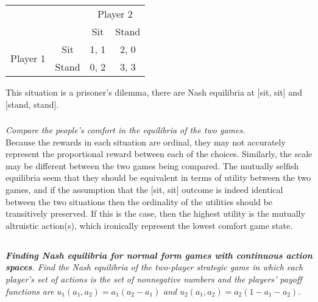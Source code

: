 \documentclass[12pt]{amsart}
\begin{document}
	\begin{center}
		\def\arraystretch{1.25}%
		\begin{tabular}{cccc}
			&                            & \multicolumn{2}{c}{Player 2}                           \\
			& \multicolumn{1}{c|}{}      & \multicolumn{1}{c|}{Sit}  & \multicolumn{1}{c|}{Stand} \\ \cline{2-4} 
			\multirow{2}{*}{Player 1} & \multicolumn{1}{c|}{Sit}   & \multicolumn{1}{c|}{1, 1} & \multicolumn{1}{c|}{2, 0}  \\ \cline{2-4} 
			& \multicolumn{1}{c|}{Stand} & \multicolumn{1}{c|}{0, 2} & \multicolumn{1}{c|}{3, 3}  \\ \cline{2-4} 
		\end{tabular}
	\end{center}
	
	This situation is a prisoner's dilemma, there are Nash equilibria at [sit, sit] and [stand, stand].
	
	\subsubsection{}
	\textit{Compare the people’s comfort in the equilibria of the two games.} \\

	Because the rewards in each situation are ordinal, they may not accurately represent the proportional
	reward between each of the choices. Similarly, the scale may be different between the two games being compared.
	The mutually selfish equilibria seem that they should be equivalent in terms of utility between the two games, 
	and if the assumption that the [sit, sit] outcome is indeed identical between the two situations
	then the ordinality of the utilities should be transitively preserved.
	If this is the case, then the highest utility is the mutually altruistic action(s), which ironically
	represent the lowest comfort game state. \\

\subsection{}
\textit{\textbf{Finding Nash equilibria for normal form games with continuous action spaces}. 
	Find the Nash equilibria of the two-player strategic game in which each player’s set of actions is the
	set of nonnegative numbers and the players’ payoff functions are}
	$u_1(a_1,a_2) =a_1(a_2-a_1)$ \textit{and} $u_2(a_1,a_2) = a_2(1-a_1-a_2)$. \\
\end{document}
